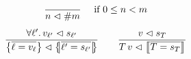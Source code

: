 \begin{gather*}
\dfrac{}{n \inbs \ssize{m}} \quad \mbox{ if $0 \le n < m$} \\[1ex]
\dfrac{\forall \ell' \ldotp v_{\ell'} \inbs \vess_{\ell'}}{\srecordval{\overline{\ell = v_\ell}} \inbs
\sproductval{\overline{\ell' = \vess_{\ell'}}}} \qquad
\dfrac{v \inbs \vess_T}{T \, v \inbs \sconcatval{\overline{T = \vess_T}}}
\end{gather*}